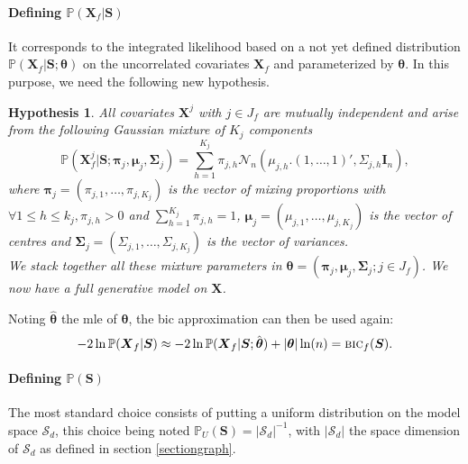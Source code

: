 \documentclass[12pt,a4paper]{report}
\newtheorem{hyp}{Hypothesis}
\begin{document}
\paragraph{Defining $\mathbb{P}(\boldsymbol{X}_f|\boldsymbol{S})$} It corresponds to the integrated likelihood based on a not yet defined distribution $\mathbb{P}(\boldsymbol{X}_f|\boldsymbol{S};\boldsymbol{\theta})$ on the uncorrelated covariates $\boldsymbol{X}_f$ and parameterized by $\boldsymbol{\theta}$. In this purpose, we need the following new hypothesis.

\begin{hyp}\label{H4}
All covariates $\boldsymbol{X}^j$ with $j \in J_f$ are mutually independent and arise from the following Gaussian mixture of $K_j$ components
\begin{equation}
\mathbb{P}(\boldsymbol{X}_f^j|\boldsymbol{S};\boldsymbol{\pi}_{j},\boldsymbol{\mu}_j,\boldsymbol{\Sigma}_j) = \sum_{h=1}^{K_j} \pi_{j,h} \mathcal{N}_n(\mu_{j,h} . (1,\ldots,1)',\Sigma_{j,h}\boldsymbol{I}_n), \nonumber
\end{equation}
where $\boldsymbol{\pi}_{j}=(\pi_{j,1},\ldots,\pi_{j,K_j})$ is the vector of mixing proportions with $\forall 1\leq h\leq k_j , \pi_{j,h}>0$ and $\sum_{h=1}^{K_j}\pi_{j,h}=1$, $\boldsymbol{\mu}_j=(\mu_{j,1},\ldots,\mu_{j,K_j})$  is the vector of centres and $\boldsymbol{\Sigma}_j=(\Sigma_{j,1},\ldots,\Sigma_{j,K_j})$ is the vector of variances. \\We stack together all these mixture parameters in $\boldsymbol{\theta}=(\boldsymbol{\pi}_{j},\boldsymbol{\mu}_j,\boldsymbol{\Sigma}_j ; j \in J_f)$. We now have a full generative model on $\boldsymbol{X}$.

\end{hyp}
		 

\vspace{3mm}

Noting $\hat{\boldsymbol{\theta}}$ the {\sc mle} of $\boldsymbol{\theta}$, the {\sc bic} approximation can then be used again:
\begin{equation}
-2\ln \mathbb{P}(\boldsymbol{X}_f|\boldsymbol{S}) \approx -2\ln \mathbb{P}(\boldsymbol{X}_f|\boldsymbol{S};\hat{\boldsymbol{\theta}}) + |{\boldsymbol{\theta}}| \ln(n) = \mbox{{\sc bic}}_f(\boldsymbol{S}). \nonumber
\end{equation}

\paragraph{Defining $\mathbb{P}(\boldsymbol{S})$} The most standard choice consists of putting a uniform distribution on the model space $\mathcal{S}_d$, this choice being noted $\mathbb{P}_U(\boldsymbol{S}) = |\mathcal{S}_d|^{-1}$, with $|\mathcal{S}_d|$ the space dimension of $\mathcal{S}_d$ as defined in section \ref{sectiongraph}.
		
\end{document}

